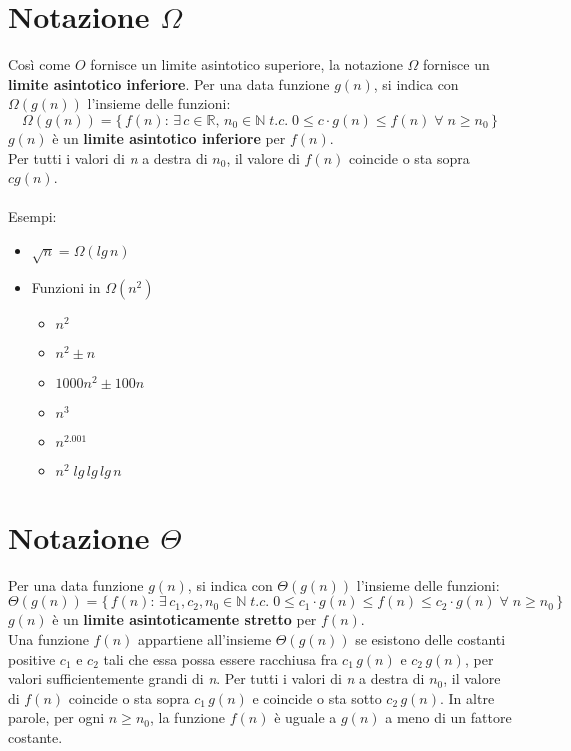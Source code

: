 \documentclass[10pt, a4paper]{report}
\begin{document}
\section{Notazione $\Omega$}
Così come $O$ fornisce un limite asintotico superiore, la notazione $\Omega$ fornisce un \textbf{limite asintotico inferiore}. Per una data funzione $g(n)$, si indica con $\Omega(g(n))$ l'insieme delle funzioni:
\begin{equation*}
\Omega(g(n)) = \{\,f(n) :\,\exists \,c\in\mathbb{R},\,n_0\in\mathbb{N}\;t.c.\;0\leq c\cdot g(n)\leq f(n)\;\forall\;n\geq n_0\,\}
\end{equation*}
$g(n)$ è un \textbf{limite asintotico inferiore} per $f(n)$.\\
Per tutti i valori di \textit{n} a destra di $n_0$, il valore di $f(n)$ coincide o sta sopra $cg(n)$.\\\\
Esempi:
\begin{itemize}
\item$\sqrt{n} = \Omega(lg\,n)$
\item Funzioni in $\Omega(n^2)$
\begin{itemize}
\item$n^2$
\item$n^2 \pm n$
\item$1000n^2 \pm 100n$
\item$n^3$
\item$n^{2.001}$
\item$n^2\;lg\,lg\,lg\,n$
\end{itemize}
\end{itemize}
\section{Notazione $\Theta$}
Per una data funzione $g(n)$, si indica con $\Theta(g(n))$ l'insieme delle funzioni:
\begin{equation*}
\Theta(g(n)) = \{\,f(n) :\,\exists \,c_1,c_2,n_0\in\mathbb{N}\;t.c.\;0\leq c_1\cdot g(n)\leq f(n)\leq c_2\cdot g(n)\;\forall\;n\geq n_0\,\}
\end{equation*}
$g(n)$ è un \textbf{limite asintoticamente stretto} per $f(n)$.\\
Una funzione $f(n)$ appartiene all'insieme $\Theta(g(n))$ se esistono delle costanti positive $c_1$ e $c_2$ tali che essa possa essere racchiusa fra $c_1\,g(n)$ e $c_2\,g(n)$, per valori sufficientemente grandi di \textit{n}. Per tutti i valori di \textit{n} a destra di $n_0$, il valore di $f(n)$ coincide o sta sopra $c_1\,g(n)$ e coincide o sta sotto $c_2\,g(n)$. In altre parole, per ogni $n \geq n_0$, la funzione $f(n)$ è uguale a $g(n)$ a meno di un fattore costante.
\end{document}
